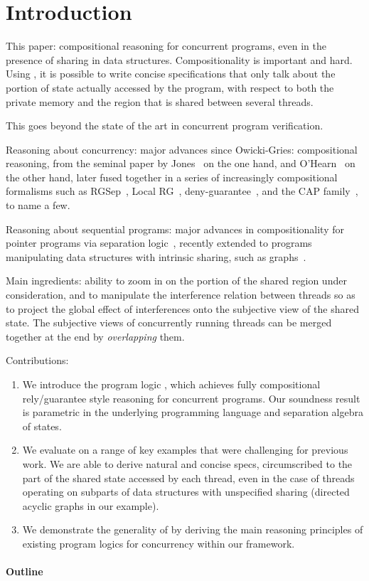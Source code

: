 \section{Introduction}

This paper: compositional reasoning for concurrent programs, even in
the presence of sharing in data structures. Compositionality is
important and hard. Using \colosl, it is possible to write concise
specifications that only talk about the portion of state actually
accessed by the program, with respect to both the private memory and
the region that is shared between several threads.

This goes beyond the state of the art in concurrent program
verification.

Reasoning about concurrency: major advances since Owicki-Gries:
compositional reasoning, from the seminal paper by Jones~\cite{rg} on
the one hand, and O'Hearn~\cite{csl-orig,csl-tcs} on the other hand,
later fused together in a series of increasingly compositional
formalisms such as RGSep~\cite{viktor-marriage}, Local RG~\cite{lrg},
deny-guarantee~\cite{dg}, and the CAP
family~\cite{cap-ecoop10,icap,tada}, to name a few.

Reasoning about sequential programs: major advances in
compositionality for pointer programs via separation
logic~\cite{seplog}, recently extended to programs manipulating data
structures with intrinsic sharing, such as graphs~\cite{ramification}.

Main ingredients: ability to zoom in on the portion of the shared
region under consideration, and to manipulate the interference
relation between threads so as to project the global effect of
interferences onto the subjective view of the shared state. The
subjective views of concurrently running threads can be merged
together at the end by \emph{overlapping} them.

Contributions:
\begin{enumerate}
\item
  We introduce the program logic \colosl, which achieves fully
  compositional rely/guarantee style reasoning for concurrent
  programs. Our soundness result is parametric in the underlying
  programming language and separation algebra of states.
\item
  We evaluate \colosl on a range of key examples that were challenging
  for previous work. We are able to derive natural and concise specs,
  circumscribed to the part of the shared state accessed by each
  thread, even in the case of threads operating on subparts of data
  structures with unspecified sharing (directed acyclic graphs in our
  example).
\item
  We demonstrate the generality of \colosl by deriving the main
  reasoning principles of existing program logics for concurrency
  within our framework.
\end{enumerate}

\paragraph{Outline}
